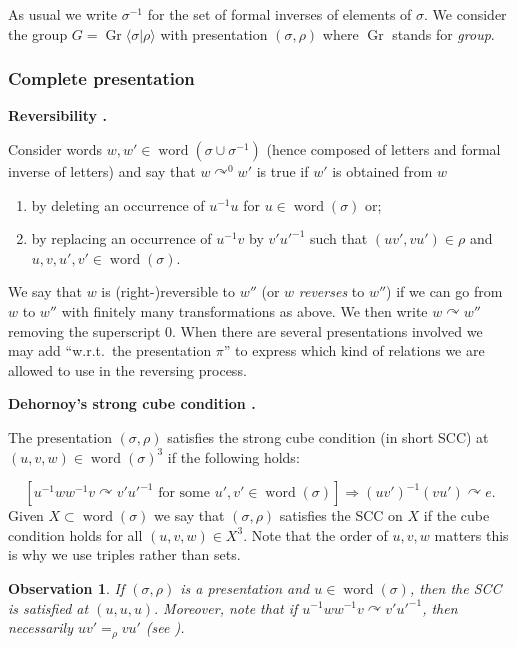 \documentclass[a4paper, 12pt]{amsart}
\numberwithin{equation}{section}
\newtheorem{observation}[theorem]{Observation}
\theoremstyle{definition}
\newcommand{\act}{\curvearrowright}
\DeclareMathOperator{\Gr}{Gr}
\newcommand{\la}{\langle}
\newcommand{\ra}{\rangle}
\DeclareMathOperator{\word}{word}
\begin{document}
As usual we write $\sigma^{-1}$ for the set of formal inverses of elements of $\sigma$.
We consider the group $G=\Gr\la \sigma|\rho\ra$ with presentation $(\sigma,\rho)$ where $\Gr$ stands for {\it group}.

\subsubsection{Complete presentation}

{\bf Reversibility \cite[Definition 1.1]{Dehornoy03}.}

Consider words $w,w'\in \word(\sigma\cup \sigma^{-1})$ (hence composed of letters and formal inverse of letters) and say that $w\act^0 w'$ is true if $w'$ is obtained from $w$
\begin{enumerate}
\item by deleting an occurrence of $u^{-1}u$ for $u \in \word(\sigma)$ or;
\item by replacing an occurrence of $u^{-1} v$ by $v'u'^{-1}$ such that $(uv',vu')\in \rho$ and $u,v,u',v'\in \word(\sigma)$.
\end{enumerate}

We say that $w$ is (right-)reversible to $w''$ (or $w$ \textit{reverses} to $w''$) if we can go from $w$ to $w''$ with finitely many transformations as above.
We then write $w\act w''$ removing the superscript 0.
When there are several presentations involved we may add ``w.r.t.~the presentation $\pi$'' to express which kind of relations we are allowed to use in the reversing process.

{\bf Dehornoy's strong cube condition \cite[Definition 3.1]{Dehornoy03}.}

The presentation $(\sigma,\rho)$ satisfies the strong cube condition (in short SCC) at  $(u,v,w)\in \word(\sigma)^3$ if the following holds:

$$[u^{-1} w w^{-1} v \act v' u'^{-1} \text{ for some } u',v'\in \word(\sigma)]\Rightarrow (uv')^{-1}(vu')\act e.$$
Given $X\subset \word(\sigma)$ we say that $(\sigma,\rho)$ satisfies the SCC on $X$ if the cube condition holds for all $(u,v,w)\in X^3.$ 
Note that the order of $u,v,w$ matters this is why we use triples rather than sets.

\begin{observation}
If $(\sigma,\rho)$ is a presentation and $u\in \word(\sigma)$, then the SCC is satisfied at $(u,u,u).$
Moreover, note that if $u^{-1} w w^{-1} v \act v' u'^{-1}$, then necessarily $uv'=_\rho vu'$ (see \cite[Lemma 1.10]{Dehornoy03}). 
\end{observation}
\end{document}
